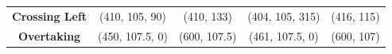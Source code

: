 \begin{table}
\begin{tabular}{ccccc}
    \textbf{Crossing Left}                                                                                  & (410, 105, 90)                                                                                 & (410, 133)                                                                   & (404, 105, 315)                                                                                & (416, 115)                                                                    \\
    \textbf{Overtaking}                                                                                     & (450, 107.5, 0)                                                                                & (600, 107.5)                                                                 & (461, 107.5, 0)                                                                                & (600, 107)                                                                    \\
    \bottomrule
    \end{tabular}
    \label{tab:simulation_scenarios_configuration_own_vessel}
\end{table}

        
        

